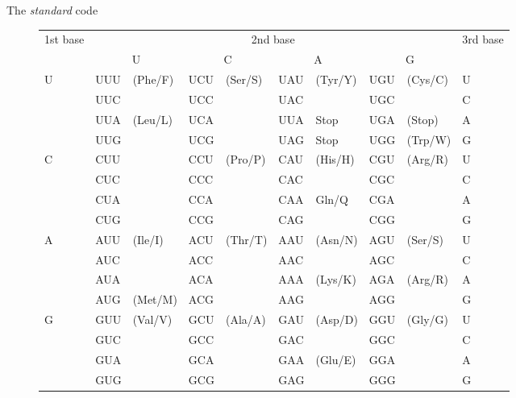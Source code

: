 \documentclass[pdf]{beamer}
\begin{document}
\begin{frame}{The \emph{standard} code}
\begin{figure}[ht]
  \tiny
  \renewcommand{\arraystretch}{1.25}
  \begin{tabular}{ |l| l l|l l| l l|l l|l| }
    \hline
    \multirow{2}{2em}{1st base} &
    \multicolumn{8}{|c|}{2nd base} &
    \multirow{2}{2em}{3rd base} \\
    \cline{2-9}
    &
    \multicolumn{2}{|c|}{U} &
    \multicolumn{2}{|c|}{C} &
    \multicolumn{2}{|c|}{A} &
    \multicolumn{2}{|c|}{G} & \\
    \hline
    \multirow{4}{2em}{U} & 
    UUU & \multirow{2}{4em}{\tiny (Phe/F)} &
    UCU & \multirow{4}{4em}{\tiny (Ser/S)} &
    UAU & \multirow{2}{4em}{\tiny (Tyr/Y)} &
    UGU & \multirow{2}{4em}{\tiny (Cys/C)} & U \\
    & UUC & & UCC & & UAC & & UGC & & C \\ \cline{2-3} \cline{6-9}
    & UUA & \multirow{6}{4em}{\tiny (Leu/L)} 
    & UCA & & UUA & Stop & UGA & (Stop) & A \\ \cline{8-9}
    & UUG & & UCG & & UAG & Stop & UGG & \tiny (Trp/W) & G \\ \cline{4-9} 
    \cline{1-1}
    \multirow{4}{2em}{C}
    & CUU & & CCU & \multirow{4}{4em}{(Pro/P)} & CAU & \multirow{2}{4em}{(His/H)} & CGU & \multirow{4}{4em}{(Arg/R)} & U \\
    & CUC & & CCC & & CAC & & CGC & & C \\ \cline{6-7}
    & CUA & & CCA & & CAA & \multirow{2}{4em}{Gln/Q} & CGA & & A \\
    & CUG & & CCG & & CAG & & CGG & & G \\ \cline{1-9}
    \multirow{4}{2em}{A}
    & AUU & \multirow{3}{4em}{(Ile/I)} & ACU & \multirow{4}{4em}{(Thr/T)} & AAU 
    & \multirow{2}{4em}{(Asn/N)} & AGU & \multirow{2}{4em}{(Ser/S)} & U \\
    & AUC & & ACC & & AAC & & AGC & & C \\ \cline{6-9}
    & AUA & & ACA & & AAA & \multirow{2}{4em}{(Lys/K)} & AGA & \multirow{2}{4em}{(Arg/R)} & A \\
    \cline{2-3}
    & AUG & (Met/M) & ACG & & AAG & & AGG & & G \\ \cline{1-9}
    \multirow{4}{4em}{G}
    & GUU & \multirow{4}{4em}{(Val/V)} & GCU & \multirow{4}{4em}{(Ala/A)} 
    & GAU & \multirow{2}{4em}{(Asp/D)} & GGU & \multirow{4}{4em}{(Gly/G)} & U \\
    & GUC & & GCC & & GAC & & GGC & & C \\ \cline{6-7}
    & GUA & & GCA & & GAA & \multirow{2}{4em}{(Glu/E)} & GGA & & A \\
    & GUG & & GCG & & GAG & & GGG & & G \\ \hline
  \end{tabular}
\end{figure}
\end{frame}
\end{document}
